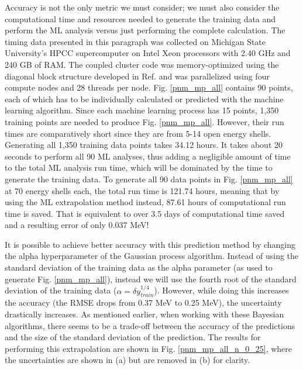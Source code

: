 Accuracy is not the only metric we must consider; we must also consider the computational time and resources needed to generate the training data and perform the ML analysis versus just performing the complete calculation. The timing data presented in this paragraph was collected on Michigan State University's HPCC supercomputer on Intel Xeon processors with 2.40 GHz and 240 GB of RAM. The coupled cluster code was memory-optimized using the diagonal block structure developed in Ref. \cite{Ref5} and was parallelized using four compute nodes and 28 threads per node. Fig. \ref{pnm_mp_all} contains 90 points, each of which has to be individually calculated or predicted with the machine learning algorithm. Since each machine learning process has 15 points, 1,350 training points are needed to produce Fig. \ref{pnm_mp_all}.  However, their run times are comparatively short since they are from 5-14 open energy shells. Generating all 1,350 training data points takes 34.12 hours. It takes about 20 seconds to perform all 90 ML analyses, thus adding a negligible amount of time to the total ML analysis run time, which will be dominated by the time to generate the training data. To generate all 90 data points in Fig. \ref{pnm_mp_all} at 70 energy shells each, the total run time is 121.74 hours, meaning that by using the ML extrapolation method instead, 87.61 hours of computational run time is saved. That is equivalent to over 3.5 days of computational time saved and a resulting error of only 0.037 MeV!

It is possible to achieve better accuracy with this prediction method by changing the alpha hyperparameter of the Gaussian process algorithm. Instead of using the standard deviation of the training data as the alpha parameter (as used to generate Fig. \ref{pnm_mp_all}), instead we will use the fourth root of the standard deviation of the training data ($\alpha = \delta y_{train}^{1/4}$). However, while doing this increases the accuracy (the RMSE drops from 0.37 MeV to 0.25 MeV), the uncertainty drastically increases. As mentioned earlier, when working with these Bayesian algorithms, there seems to be a trade-off between the accuracy of the predictions and the size of the standard deviation of the prediction. The results for performing this extrapolation are shown in Fig. \ref{pnm_mp_all_n_0_25}, where the uncertainties are shown in (a) but are removed in (b) for clarity.

